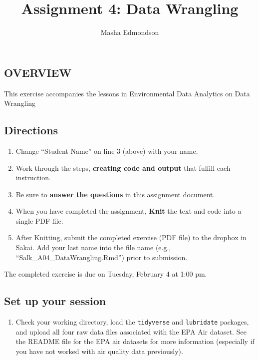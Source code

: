 \documentclass[]{article}
\title{Assignment 4: Data Wrangling}
\author{Masha Edmondson}
\date{}
\providecommand{\tightlist}{%
  \setlength{\itemsep}{0pt}\setlength{\parskip}{0pt}}
\begin{document}
\maketitle

\hypertarget{overview}{%
\subsection{OVERVIEW}\label{overview}}

This exercise accompanies the lessons in Environmental Data Analytics on
Data Wrangling

\hypertarget{directions}{%
\subsection{Directions}\label{directions}}

\begin{enumerate}
\def\labelenumi{\arabic{enumi}.}
\tightlist
\item
  Change ``Student Name'' on line 3 (above) with your name.
\item
  Work through the steps, \textbf{creating code and output} that fulfill
  each instruction.
\item
  Be sure to \textbf{answer the questions} in this assignment document.
\item
  When you have completed the assignment, \textbf{Knit} the text and
  code into a single PDF file.
\item
  After Knitting, submit the completed exercise (PDF file) to the
  dropbox in Sakai. Add your last name into the file name (e.g.,
  ``Salk\_A04\_DataWrangling.Rmd'') prior to submission.
\end{enumerate}

The completed exercise is due on Tuesday, February 4 at 1:00 pm.

\hypertarget{set-up-your-session}{%
\subsection{Set up your session}\label{set-up-your-session}}

\begin{enumerate}
\def\labelenumi{\arabic{enumi}.}
\tightlist
\item
  Check your working directory, load the \texttt{tidyverse} and
  \texttt{lubridate} packages, and upload all four raw data files
  associated with the EPA Air dataset. See the README file for the EPA
  air datasets for more information (especially if you have not worked
  with air quality data previously).
\end{enumerate}
\end{document}
